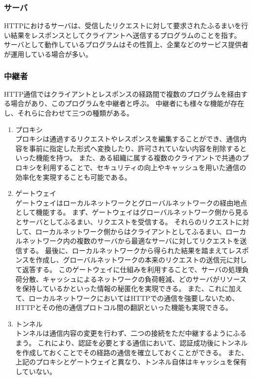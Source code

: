 \documentclass[12pt,a4paper]{jbook}
\begin{document}
\subsubsection{サーバ}
HTTPにおけるサーバは、受信したリクエストに対して要求されたふるまいを行い結果をレスポンスとしてクライアントへ送信するプログラムのことを指す。
サーバとして動作しているプログラムはその性質上、企業などのサービス提供者が運用している場合が多い。

\subsubsection{中継者}
\label{sec:intermediary}
HTTP通信ではクライアントとレスポンスの経路間で複数のプログラムを経由する場合があり、このプログラムを中継者と呼ぶ。
中継者にも様々な機能が存在し、それらに合わせて三つの種類がある。
\begin{enumerate}
\item プロキシ\\
プロキシは通過するリクエストやレスポンスを編集することができ、通信内容を事前に指定した形式へ変換したり、許可されていない内容を削除するといった機能を持つ。
また、ある組織に属する複数のクライアントで共通のプロキシを利用することで、セキュリティの向上やキャッシュを用いた通信の効率化を実現することも可能である。
\item ゲートウェイ\\
ゲートウェイはローカルネットワークとグローバルネットワークの経由地点として機能する。
まず、ゲートウェイはグローバルネットワーク側から見るとサーバとしてふるまい、リクエストを受信する。
それらのリクエストに対して、ローカルネットワーク側からはクライアントとしてふるまい、ローカルネットワーク内の複数のサーバから最適なサーバに対してリクエストを送信する。
最後に、ローカルネットワークから得られた結果を踏まえてレスポンスを作成し、グローバルネットワークの本来のリクエストの送信元に対して返答する。
このゲートウェイに仕組みを利用することで、サーバの処理負荷分散、キャッシュによるネットワークの負荷軽減、どのサーバがリソースを保持しているかといった情報の秘匿化を実現できる。
また、これに加えて、ローカルネットワークにおいてはHTTPでの通信を強要しないため、HTTPとその他の通信プロトコル間の翻訳といった機能も実現できる。
\item トンネル\\
トンネルは通信内容の変更を行わず、二つの接続をただ中継するようにふるまう。
これにより、認証を必要とする通信において、認証成功後にトンネルを作成しておくことでその経路の通信を確立しておくことができる。
また、上記のプロキシとゲートウェイと異なり、トンネル自体はキャッシュを保有していない。
\end{enumerate}
\end{document}
